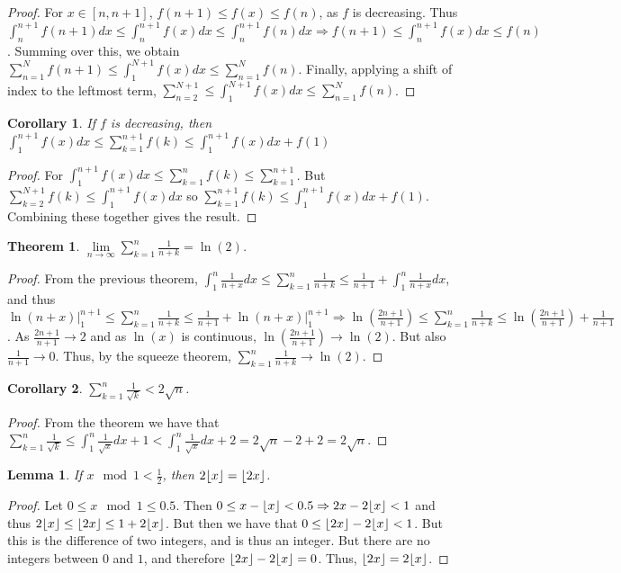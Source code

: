 \documentclass[crop=false,class=book]{standalone}
\theoremstyle{mystyle}
\newtheorem{theorem}{Theorem}[section]
\newtheorem{lemma}{Lemma}[section]
\newtheorem{corollary}{Corollary}[section]
\DeclarePairedDelimiter\floor{\lfloor}{\rfloor}
\begin{document}
\begin{proof}
For $x\in [n,n+1]$, $f(n+1)\leq f(x)\leq f(n)$, as $f$ is decreasing. Thus $\int_{n}^{n+1} f(n+1)dx \leq \int_{n}^{n+1} f(x) dx \leq \int_{n}^{n+1} f(n)dx \Rightarrow f(n+1) \leq \int_{n}^{n+1}f(x)dx \leq f(n)$. Summing over this, we obtain $\sum_{n=1}^{N} f(n+1) \leq \int_{1}^{N+1} f(x) dx \leq \sum_{n=1}^{N} f(n)$. Finally, applying a shift of index to the leftmost term, $\sum_{n=2}^{N+1} \leq \int_{1}^{N+1}f(x)dx \leq \sum_{n=1}^{N} f(n)$. 
\end{proof}
\begin{corollary}
If $f$ is decreasing, then $\int_{1}^{n+1} f(x)dx \leq \sum_{k=1}^{n+1} f(k) \leq \int_{1}^{n+1} f(x)dx + f(1)$
\end{corollary}
\begin{proof}
For $\int_{1}^{n+1}f(x) dx \leq \sum_{k=1}^{n}f(k)\leq \sum_{k=1}^{n+1}$. But $\sum_{k=2}^{N+1} f(k) \leq \int_{1}^{n+1}f(x)dx$ so $\sum_{k=1}^{n+1}f(k) \leq \int_{1}^{n+1}f(x)dx +f(1)$. Combining these together gives the result.
\end{proof}
\begin{theorem}
$\underset{n\rightarrow \infty}\lim \sum_{k=1}^{n} \frac{1}{n+k} = \ln(2)$.
\end{theorem}
\begin{proof}
From the previous theorem, $\int_{1}^{n} \frac{1}{n+x} dx \leq \sum_{k=1}^{n} \frac{1}{n+k} \leq \frac{1}{n+1} + \int_{1}^{n} \frac{1}{n+x}dx$, and thus $\ln(n+x)\big|_{1}^{n+1} \leq \sum_{k=1}^{n} \frac{1}{n+k}\leq \frac{1}{n+1}+\ln(n+x)\big|_{1}^{n+1}\Rightarrow \ln(\frac{2n+1}{n+1})\leq \sum_{k=1}^{n} \frac{1}{n+k} \leq \ln(\frac{2n+1}{n+1})+\frac{1}{n+1}$. As $\frac{2n+1}{n+1}\rightarrow 2$ and as $\ln(x)$ is continuous, $\ln(\frac{2n+1}{n+1})\rightarrow \ln(2)$. But also $\frac{1}{n+1}\rightarrow 0$. Thus, by the squeeze theorem, $\sum_{k=1}^{n} \frac{1}{n+k} \rightarrow \ln(2)$.
\end{proof}
\begin{corollary}
$\sum_{k=1}^{n}\frac{1}{\sqrt{k}}< 2\sqrt{n}$.
\end{corollary}
\begin{proof}
From the theorem we have that $\sum_{k=1}^{n} \frac{1}{\sqrt{k}} \leq \int_{1}^{n}\frac{1}{\sqrt{x}}dx + 1 < \int_{1}^{n} \frac{1}{\sqrt{x}}dx +2 = 2\sqrt{n}-2+2 = 2\sqrt{n}$.
\end{proof}
\begin{lemma}
If $x\mod 1 < \frac{1}{2}$, then $2\floor{x} = \floor{2x}$.
\end{lemma}
\begin{proof}
Let $0\leq x \mod 1 \leq 0.5$. Then $0 \leq x-\floor{x}<0.5 \Rightarrow 2x-2\floor{x} <1$ and thus $2\floor{x} \leq \floor{2x} \leq 1+2\floor{x}$. But then we have that $0 \leq \floor{2x}-2\floor{x} <1$. But this is the difference of two integers, and is thus an integer. But there are no integers between $0$ and $1$, and therefore $\floor{2x}-2\floor{x} = 0$. Thus, $\floor{2x}=2\floor{x}$.
\end{proof}
\end{document}
